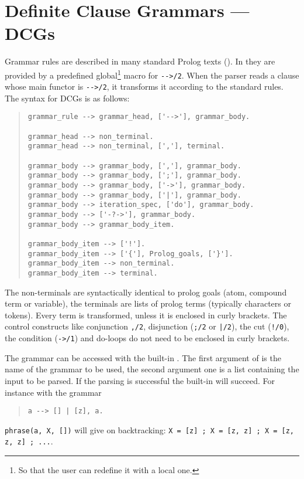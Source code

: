 \section{Definite Clause Grammars --- DCGs}
\label{dcg}
Grammar rules are described in many standard Prolog texts (\cite{clocksin81}).
In {\eclipse} they are provided by a predefined global\footnote{
So that the user can redefine it with a local one.} macro for
{\tt -}{\tt ->/2}.
When the parser reads a clause whose main functor is {\tt -}{\tt ->/2}, it transforms 
it according to the standard rules.
The syntax for DCGs is as follows: 
\begin{quote}
\begin{verbatim}
grammar_rule --> grammar_head, ['-->'], grammar_body.

grammar_head --> non_terminal.
grammar_head --> non_terminal, [','], terminal.

grammar_body --> grammar_body, [','], grammar_body.
grammar_body --> grammar_body, [';'], grammar_body.
grammar_body --> grammar_body, ['->'], grammar_body.
grammar_body --> grammar_body, ['|'], grammar_body.
grammar_body --> iteration_spec, ['do'], grammar_body.
grammar_body --> ['-?->'], grammar_body.
grammar_body --> grammar_body_item.

grammar_body_item --> ['!'].
grammar_body_item --> ['{'], Prolog_goals, ['}'].
grammar_body_item --> non_terminal.
grammar_body_item --> terminal.
\end{verbatim}
\end{quote}
The non-terminals are syntactically identical to prolog goals (atom, compound
term or variable), the terminals are lists of prolog terms (typically
characters or tokens). Every 
term is transformed, unless it is enclosed in curly brackets. The control
constructs like conjunction {\tt ,/2}, disjunction ({\tt ;/2} or {\tt |/2}),
the cut ({\tt !/0}), the condition ({\tt ->/1}) and do-loops do not need to
be enclosed in curly brackets.

The grammar can be accessed with the built-in .
The first argument of  is the name of the
grammar to be used, the 
second argument one is a list containing the input to be parsed. If the
parsing is successful the built-in will succeed.
For instance with the grammar
\begin{quote}
\begin{verbatim}
a --> [] | [z], a.
\end{verbatim}
\end{quote}
{\tt phrase(a, X, [])} will give on backtracking: {\tt X = [z] ; X = [z, z] ; X = [z, z, z] ; ...}.

